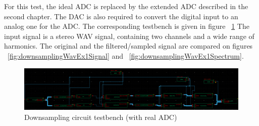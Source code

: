 For this test, the ideal ADC is replaced by the extended ADC described in the second chapter. The DAC is also required to convert the digital input to an analog one for the ADC. The corresponding testbench is given in figure ~\ref{fig:downsamplingADCTestbench} The input signal is a stereo WAV signal, containing two channels and a wide range of harmonics. The original and the filtered/sampled signal are compared on figures ~\ref{fig:downsamplingWavEx1Signal} and ~\ref{fig:downsamplingWavEx1Spectrum}. 
\begin{figure}[!h]
	\centering 
	\includegraphics[scale=0.27]{images/DownsamplingCircuit/wav_downsampling.png}
	\caption{Downsampling circuit testbench (with real ADC)}
	\label{fig:downsamplingADCTestbench}
\end{figure}



